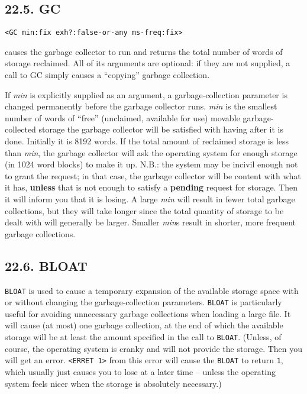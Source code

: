 \documentclass[a4paper,]{article}
\begin{document}
\subsection{22.5. GC}\label{gc-1}

\begin{verbatim}
<GC min:fix exh?:false-or-any ms-freq:fix>
\end{verbatim}

 causes the garbage collector to run and returns the total number of words of storage reclaimed.
All of its arguments are optional: if they are not supplied, a call to GC simply causes a ``copying'' garbage collection.

If \emph{min} is explicitly supplied as an argument, a garbage-collection parameter is changed permanently before the
garbage collector runs. \emph{min} is the smallest number of words of ``free'' (unclaimed, available for use) movable
garbage-collected storage the garbage collector will be satisfied with having after it is done. Initially it is 8192 words.
If the total amount of reclaimed storage is less than \emph{min}, the garbage collector will ask the operating system for
enough storage (in 1024 word blocks) to make it up. N.B.: the system may be incivil enough not to grant the request; in
that case, the garbage collector will be content with what it has, \textbf{unless} that is not enough to satisfy a
\textbf{pending} request for storage. Then it will inform you that it is losing. A large \emph{min} will result in fewer
total garbage collections, but they will take longer since the total quantity of storage to be dealt with will generally be
larger. Smaller \emph{min}s result in shorter, more frequent garbage collections.

\subsection{22.6. BLOAT}\label{bloat}

\texttt{BLOAT} is used to cause a temporary expansion of the available storage space with or
without changing the garbage-collection parameters. \texttt{BLOAT} is particularly useful for avoiding unnecessary garbage
collections when loading a large file. It will cause (at most) one garbage collection, at the end of which the available
storage will be at least the amount specified in the call to \texttt{BLOAT}. (Unless, of course, the operating system is
cranky and will not provide the storage. Then you will get an error. \texttt{\textless{}ERRET\ 1\textgreater{}} from this
error will cause the \texttt{BLOAT} to return \texttt{1}, which usually just causes you to lose at a later time -- unless
the operating system feels nicer when the storage is absolutely necessary.)
\end{document}
